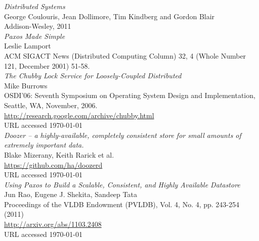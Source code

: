 \documentclass[10pt, oneside]{article}
\begin{document}
\begin{thebibliography}{9}

 \emph{Distributed Systems}\\
\newblock George Coulouris, Jean Dollimore, Tim Kindberg and Gordon Blair\\
\newblock Addison-Wesley, 2011\\

 \emph{Paxos Made Simple}\\
\newblock Leslie Lamport\\
\newblock ACM SIGACT News (Distributed Computing Column) 32, 4 (Whole Number
121, December 2001) 51-58.\\

 \emph{The Chubby Lock Service for Loosely-Coupled Distributed}\\
\newblock Mike Burrows\\
\newblock OSDI'06: Seventh Symposium on Operating System Design and Implementation,
Seattle, WA, November, 2006.\\
\newblock \url{http://research.google.com/archive/chubby.html}\\
\newblock URL accessed \today\\

 \emph{Doozer -- a highly-available, completely consistent store for
    small amounts of extremely important data.}\\
\newblock Blake Mizerany, Keith Rarick et al.\\
\newblock \url{https://github.com/ha/doozerd} \\
\newblock URL accessed \today\\

 \emph{Using Paxos to Build a Scalable, Consistent, and
    Highly Available Datastore}\\
\newblock Jun Rao, Eugene J. Shekita, Sandeep Tata\\
\newblock Proceedings of the VLDB Endowment (PVLDB), Vol. 4, No. 4, pp. 243-254
(2011)\\
\newblock \url{http://arxiv.org/abs/1103.2408}\\
\newblock URL accessed \today\\

\end{thebibliography}
\end{document}
